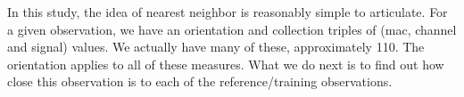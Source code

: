 
In this study, the idea of nearest neighbor is 
reasonably simple to articulate.
For a given observation,
we have an orientation
and  collection triples of 
(mac, channel and signal)
values.
We actually have many of these, approximately 110.
The orientation applies to all of these measures.
What we do next is to find out how
close this observation is to each of the
reference/training observations.


